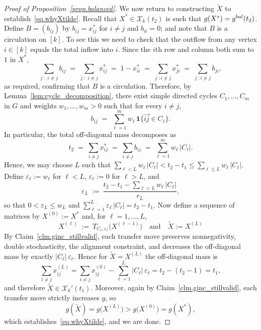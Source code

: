 \documentclass[10pt,a4paper]{amsart}
\newcommand{\cX}{\mathcal{X}}
\begin{document}
\begin{proof}[Proof of Proposition~\ref{prop.balanced}]
We now return to constructing $\widetilde{X}$ to establish~\eqref{eq.whyXtilde}. Recall that $X^*\in\cX_k(t_2)$ is such that $g(X^*)=g^{\rm bal}(t_2)$.
Define $B=(b_{ij})$ by $b_{ij}=x^*_{ij}$ for $i\neq j$ and $b_{ii}=0$; and note that $B$ is a circulation on $[k]$. To see this we need to check that the outflow from any vertex $i\in[k]$ equals the total inflow into $i$. Since the $i$th row and column both sum to $1$ in $X^*$,
\[
\sum_{j\; : \; i\neq j} b_{ij}
\;=\;
\sum_{j\; : \; i\neq j} x^*_{ij}
\;=\;
1-x^*_{ii}
\;=\;
\sum_{j\; :i \neq j} x^*_{ji}
\;=\;
\sum_{j\; :i \neq j} b_{ji},
\]
as required, confirming that $B$ is a circulation. 
%
%
Therefore, by Lemma~\ref{lem:cycle_decomposition}, there exist simple directed cycles $C_1,\dots,C_m$ in $G$
and weights $w_1,\dots,w_m>0$ such that for every $i\neq j$,
\[
b_{ij} \;=\; \sum_{\ell=1}^m w_\ell\,\mathbf{1}\{\vec{ij}\in C_\ell\}.
\]
In particular, the total off-diagonal mass decomposes as
\begin{equation}
\label{eq:cycle_capacity_sum}
t_2 \;=\; \sum_{i\neq j} x^*_{ij}
\;=\; \sum_{i\neq j} b_{ij}
\;=\; \sum_{\ell=1}^m w_\ell \, |C_\ell|.
\end{equation}
%
%
%
Hence, we may choose $L$ such that $\sum_{\ell< L} w_\ell \, |C_\ell| < t_2 - t_1 \le \sum_{\ell\le L}  w_\ell \, | C_\ell|$.
Define $\varepsilon_\ell:=w_\ell$ for $\ell<L$, $\varepsilon_\ell:=0$ for $\ell>L$, and
\[
\varepsilon_L \ :=\ \frac{t_2 - t_1 - \sum_{\ell< L} w_\ell \, |C_\ell| }{r_L},
\]
so that $0<\varepsilon_L\le w_L$ and $\sum_{\ell=1}^L  \varepsilon_\ell \, |C_\ell| =t_2 - t_1$.
%
Now define a sequence of matrices by $X^{(0)}:=X^*$ and, for $\ell=1,\dots,L$,
\[
X^{(\ell)}\ :=\ T_{C_\ell,\varepsilon_\ell}\big(X^{(\ell-1)}\big) \quad\mbox{and}\quad \widetilde{X}:=X^{(L)}
\]
By Claim~\ref{clm.ginc_stillvalid}, each transfer move preserves nonnegativity, double stochasticity, the alignment constraint,
and decreases the off-diagonal mass by exactly $|C_\ell|\, \varepsilon_\ell$. Hence for $\widetilde{X}=X^{(L)}$ the off-diagonal mass is
\[
\sum_{i\neq j} x^{(L)}_{ij}
=
\sum_{i\neq j} x^{(0)}_{ij} - \sum_{\ell=1}^L |C_\ell|\, \varepsilon_\ell
=
t_2-(t_2-1)
=
t_1,
\]
and therefore $\widetilde X\in \cX_k'(t_1)$.
%
Moreover, again by Claim~\ref{clm.ginc_stillvalid}, each transfer move strictly increases $g$, so
\[
g(\widetilde X)
=
g\big(X^{(L)}\big)
>
g\big(X^{(0)}\big)
=
g(X^*),
\]
which establishes~\eqref{eq.whyXtilde}, and we are done.
\end{proof}
\end{document}
